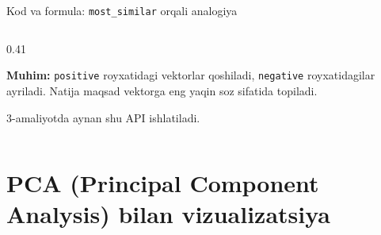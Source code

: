 \documentclass[aspectratio=169,11pt]{beamer}
\begin{document}
\begin{frame}[fragile]{Kod va formula: \texttt{most\_similar} orqali analogiya}
\begin{columns}[T,totalwidth=\textwidth]
\begin{column}{0.41\textwidth}
\vspace{5pt}

\begin{tcolorbox}[defbox,left=2mm,right=2mm,top=1mm,bottom=1mm]
\footnotesize
\textbf{Muhim:} \texttt{positive} ro\textquotesingle{}yxatidagi vektorlar
qo\textquotesingle{}shiladi, \texttt{negative} ro\textquotesingle{}yxatidagilar
ayriladi. Natija maqsad vektorga eng yaqin so\textquotesingle{}z sifatida topiladi.
\end{tcolorbox}

\vspace{2pt}
\footnotesize
3-amaliyotda aynan shu API ishlatiladi.
\end{column}
\end{columns}

\end{frame}

\section[Vizualizatsiya]{PCA (Principal Component Analysis) bilan vizualizatsiya}
\end{document}
